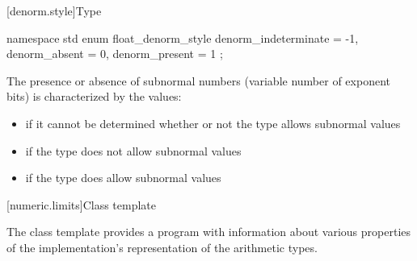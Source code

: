 [denorm.style]{Type }

%
\begin{codeblock}
namespace std {
  enum float_denorm_style {
    denorm_indeterminate = -1,
    denorm_absent = 0,
    denorm_present = 1
  };
}
\end{codeblock}

%
%
%
%
\pnum
The presence or absence of subnormal numbers (variable number of exponent bits)
is characterized by the values:
\begin{itemize}
\item
{}%
if it cannot be determined whether or not the type allows subnormal values
\item
{}%
if the type does not allow subnormal values
\item
{}%
if the type does allow subnormal values
\end{itemize}

[numeric.limits]{Class template }

\pnum
The
%
class template provides a \Cpp{} program with information about various properties of
the implementation's representation of the
arithmetic types.

